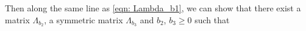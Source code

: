 %
Then along the same line as \eqref{eqn: Lambda_b1}, we can show that there exist a matrix $\Lambda_{b_2}$, a symmetric matrix $\Lambda_{b_3}$ and $b_2$, $b_3 \geq 0$ such that
